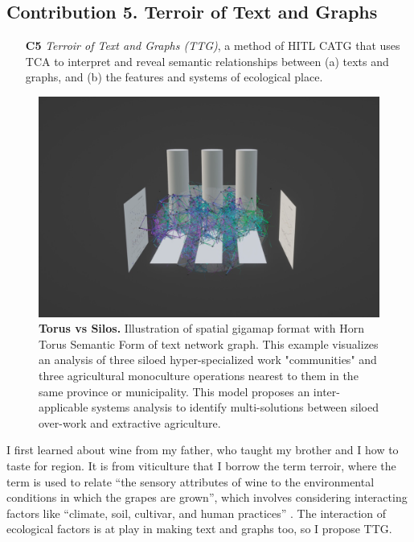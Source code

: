 \subsection{Contribution 5. Terroir of Text and Graphs}
\begin{enumerate}
        \item[\textbf{C5}] \textit{Terroir of Text and Graphs (TTG)}, a method of HITL CATG that uses TCA to interpret and reveal semantic relationships between (a) texts and graphs, and (b) the features and systems of ecological place.
\end{enumerate}
\FloatBarrier
\begin{figure}[h]
    \centering
    \includegraphics[width=\linewidth]{figures/6.2.png}
    \caption[Torus vs Silos]{\textbf{Torus vs Silos.} Illustration of spatial gigamap format with Horn Torus Semantic Form of text network graph. This example visualizes an analysis of three siloed hyper-specialized work "communities" and three agricultural monoculture operations nearest to them in the same province or municipality. This model proposes an inter-applicable systems analysis to identify multi-solutions between siloed over-work and extractive agriculture.}
    \label{f6.2}
\end{figure}
\FloatBarrier

I first learned about wine from my father, who taught my brother and I how to taste for region. It is from viticulture that I borrow the term terroir, where the term is used to relate “the sensory attributes of wine to the environmental conditions in which the grapes are grown”, which involves considering interacting factors like “climate, soil, cultivar, and human practices” \citep[p. 1]{van_leeuwen_concept_2006-1}. The interaction of ecological factors is at play in making text and graphs too, so I propose TTG. 

